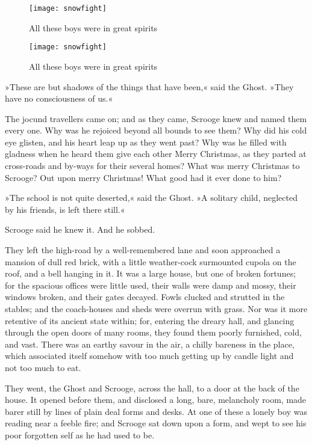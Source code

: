 \begin{letter}
	\begin{figure}[tbh]
		\centering
		\texttt{[image: snowfight]}
		\caption{All these boys were in great spirits}
	\end{figure}
\end{letter}

\begin{a4}
	\begin{figure}[tbh]
		\centering
		\texttt{[image: snowfight]}
		\caption{All these boys were in great spirits}
	\end{figure}
\end{a4}



»These are but shadows of the things that have been,« said the Ghost. »They have no consciousness of us.«

The jocund travellers came on; and as they came, Scrooge knew and named them every one. Why was he rejoiced beyond all  bounds to see them? Why did his cold eye glisten, and his heart leap up as they went past? Why was he filled with gladness when he heard them give each other Merry Christmas, as they parted at cross-roads and by-ways for their several homes? What was merry Christmas to Scrooge? Out upon merry Christmas! What good had it ever done to him?

»The school is not quite deserted,« said the Ghost. »A solitary child, neglected by his friends, is left there still.«

Scrooge said he knew it. And he sobbed.

They left the high-road by a well-remembered lane and soon approached a mansion of dull red brick, with a little weather-cock surmounted cupola on the roof, and a bell hanging in it. It was a large house, but one of broken fortunes; for the spacious offices were little used, their walls were damp and mossy, their windows broken, and their gates decayed. Fowls clucked and strutted in the stables; and the coach-houses and sheds were overrun with grass. Nor was it more retentive of its ancient state within; for, entering the dreary hall, and glancing through the open doors of many rooms, they found them poorly furnished, cold, and vast. There was an earthy savour in the air, a chilly bareness in the place, which associated itself somehow with too much getting up by candle light and not too much to eat.

They went, the Ghost and Scrooge, across the hall, to a door at the back of the house. It opened before them, and disclosed a long, bare, melancholy room, made barer still by lines of plain deal forms and desks. At one of these a lonely boy was reading near a feeble fire; and Scrooge sat down upon a form, and wept to see his poor forgotten self as he had used to be.

